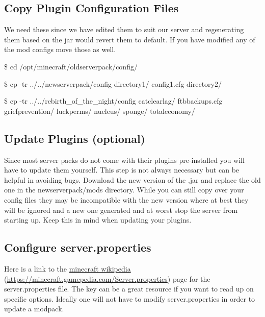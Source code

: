 \documentclass{report}
\begin{document}
\subsection{Copy Plugin Configuration Files}
We need these since we have edited them to suit our server and regenerating them based on the jar would revert them to default. If you have modified any of the mod configs move those as well.

\begin{mdframed}[style=Code, frametitle=Move Current Directory]
	\$ cd /opt/minecraft/oldserverpack/config/
\end{mdframed}

\begin{mdframed}[style=Code, frametitle=Generic Example]
	\$ cp -tr ../../newserverpack/config directory1/ config1.cfg directory2/
\end{mdframed}

\begin{mdframed}[style=Code, frametitle=Real Example]
	\$ cp -tr ../../rebirth\_of\_the\_night/config catclearlag/ ftbbackups.cfg
	 griefprevention/ luckperms/ nucleus/ sponge/ totaleconomy/
\end{mdframed}

\subsection{Update Plugins (optional)}
Since most server packs do not come with their plugins pre-installed you will have to update them yourself. This step is not always necessary but can be helpful in avoiding bugs. Download the new version of the .jar and replace the old one in the newserverpack/mods directory. While you can still copy over your config files they may be incompatible with the new version where at best they will be ignored and a new one generated and at worst stop the server from starting up. Keep this in mind when updating your plugins.

\subsection{Configure server.properties}
Here is a link to the \href{https://minecraft.gamepedia.com/Server.properties}{minecraft wikipedia} (\url{https://minecraft.gamepedia.com/Server.properties}) page for the server.properties file. The key can be a great resource if you want to read up on specific options. Ideally one will not have to modify server.properties in order to update a modpack.
\end{document}
